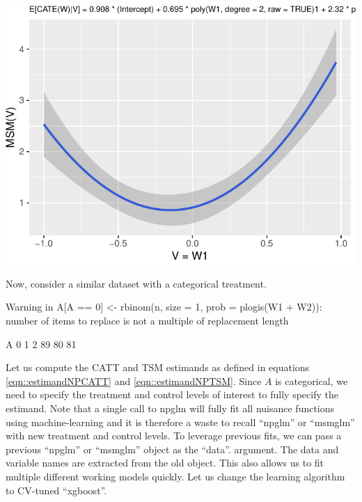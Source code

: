\documentclass[
]{jss}
\begin{document}
\begin{CodeChunk}
\begin{center}\includegraphics{causalglm_files/figure-latex/unnamed-chunk-4-1} \end{center}

\end{CodeChunk}

Now, consider a similar dataset with a categorical treatment.

\begin{CodeChunk}
\begin{CodeOutput}
Warning in A[A == 0] <- rbinom(n, size = 1, prob = plogis(W1 + W2)): number of
items to replace is not a multiple of replacement length
\end{CodeOutput}
\begin{CodeOutput}
A
 0  1  2 
89 80 81 
\end{CodeOutput}
\end{CodeChunk}

Let us compute the CATT and TSM estimands as defined in equations
\ref{eqn::estimandNPCATT} and \ref{eqn::estimandNPTSM}. Since \(A\) is
categorical, we need to specify the treatment and control levels of
interest to fully specify the estimand. Note that a single call to npglm
will fully fit all nuisance functions using machine-learning and it is
therefore a waste to recall ``npglm'' or ``msmglm'' with new treatment
and control levels. To leverage previous fits, we can pass a previous
``npglm'' or ``msmglm'' object as the ``data''. argument. The data and
variable names are extracted from the old object. This also allows us to
fit multiple different working models quickly. Let us change the
learning algorithm to CV-tuned ``xgboost''.
\end{document}
